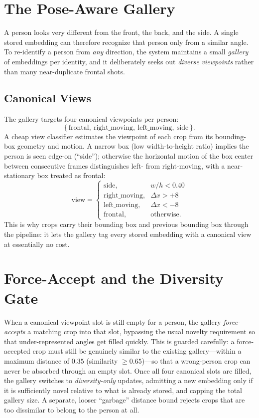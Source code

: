 \documentclass[12pt]{report}
\begin{document}
\section{The Pose-Aware Gallery}
A person looks very different from the front, the back, and the side. A single stored embedding can therefore recognize that person only from a similar angle. To re-identify a person from \emph{any} direction, the system maintains a small \emph{gallery} of embeddings per identity, and it deliberately seeks out \emph{diverse viewpoints} rather than many near-duplicate frontal shots.

\subsection{Canonical Views}
The gallery targets four canonical viewpoints per person:
\[
\{\, \text{frontal},\ \text{right\_moving},\ \text{left\_moving},\ \text{side} \,\}.
\]
A cheap view classifier estimates the viewpoint of each crop from its bounding-box geometry and motion. A narrow box (low width-to-height ratio) implies the person is seen edge-on (``side''); otherwise the horizontal motion of the box center between consecutive frames distinguishes left- from right-moving, with a near-stationary box treated as frontal:
\[
\text{view} =
\begin{cases}
\text{side}, & w/h < 0.40 \\
\text{right\_moving}, & \Delta x > +8 \\
\text{left\_moving}, & \Delta x < -8 \\
\text{frontal}, & \text{otherwise.}
\end{cases}
\]
This is why crops carry their bounding box and previous bounding box through the pipeline: it lets the gallery tag every stored embedding with a canonical view at essentially no cost.

\section{Force-Accept and the Diversity Gate}
When a canonical viewpoint slot is still empty for a person, the gallery \emph{force-accepts} a matching crop into that slot, bypassing the usual novelty requirement so that under-represented angles get filled quickly. This is guarded carefully: a force-accepted crop must still be genuinely similar to the existing gallery---within a maximum distance of $0.35$ (similarity $\geq 0.65$)---so that a wrong-person crop can never be absorbed through an empty slot. Once all four canonical slots are filled, the gallery switches to \emph{diversity-only} updates, admitting a new embedding only if it is sufficiently novel relative to what is already stored, and capping the total gallery size. A separate, looser ``garbage'' distance bound rejects crops that are too dissimilar to belong to the person at all.
\end{document}
